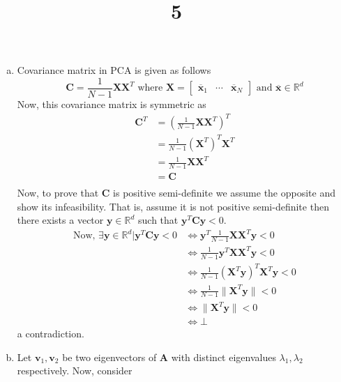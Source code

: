 \documentclass[a4paper]{article}
\title{5}
\date{}
\begin{document}
\maketitle
\begin{enumerate}[(a)]
\item 
Covariance matrix in PCA is given as follows
\begin{equation}
	\bm{C} = \frac{1}{N-1}\bm{X}\bm{X}^T \text{ where $\bm{X} = \begin{bmatrix} \overline{\bm{x}}_1 & \cdots & \overline{\bm{x}}_N \end{bmatrix}$ and $\overline{\bm{x}}\in \mathbb{R}^d$}
\end{equation}
Now, this covariance matrix is symmetric as
\begin{equation}
\begin{aligned}
	\bm{C}^T &= \left(\frac{1}{N-1}\bm{X}\bm{X}^T\right)^T\\
	& = \frac{1}{N-1}(\bm{X}^T)^T \bm{X}^T \\	
	& = \frac{1}{N-1}\bm{X}\bm{X}^T \\	
	& = \bm{C} \\	
\end{aligned}
\end{equation}
Now, to prove that $\bm{C}$ is positive semi-definite we assume the opposite and show its infeasibility. That is, assume it is not positive semi-definite then there exists a vector $\bm{y}\in\mathbb{R}^d$ such that $\bm{y}^T\bm{C}\bm{y}<0$.
\begin{equation}
 	\begin{aligned}
 		\text{Now, }\exists \bm{y}\in\mathbb{R}^d | \bm{y}^T\bm{C}\bm{y}<0&\Leftrightarrow\bm{y}^T\frac{1}{N-1}\bm{X}\bm{X}^T\bm{y}<0\\
 		&\Leftrightarrow \frac{1}{N-1}\bm{y}^T\bm{X}\bm{X}^T\bm{y}<0\\
 		&\Leftrightarrow \frac{1}{N-1}(\bm{X}^T\bm{y})^T\bm{X}^T\bm{y}<0\\
 		&\Leftrightarrow \frac{1}{N-1}\|\bm{X}^T\bm{y}\|<0\\
 		&\Leftrightarrow \|\bm{X}^T\bm{y}\|<0\\
 		&\Leftrightarrow \bot
 	\end{aligned}
\end{equation}
a contradiction.
\item 
Let $\bm{v}_1, \bm{v}_2$ be two eigenvectors of $\bm{A}$ with distinct eigenvalues $\lambda_1, \lambda_2$ respectively.
Now, consider
\begin{equation}
	\begin{aligned}

\end{aligned}
\end{equation}
\end{enumerate}
\end{document}
